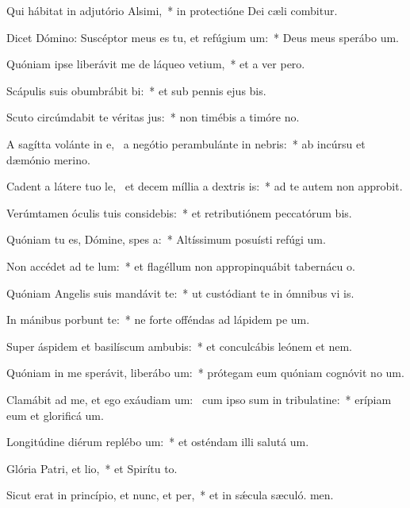 \item Qui hábitat in adjutório Alsimi,~* in protectióne Dei cæli combitur.
\item Dicet Dómino: Suscéptor meus es tu, et refúgium um:~* Deus meus sperábo  um.
\item Quóniam ipse liberávit me de láqueo vetium,~* et a ver pero.
\item Scápulis suis obumbrábit bi:~* et sub pennis ejus bis.
\item Scuto circúmdabit te véritas jus:~* non timébis a timóre no.
\item A sagítta volánte in e,~\pscross{} a negótio perambulánte in nebris:~* ab incúrsu et dæmónio merino.
\item Cadent a látere tuo le,~\pscross{} et decem míllia a dextris is:~* ad te autem non approbit.
\item Verúmtamen óculis tuis considebis:~* et retributiónem peccatórum bis.
\item Quóniam tu es, Dómine, spes a:~* Altíssimum posuísti refúgi um.
\item Non accédet ad te lum:~* et flagéllum non appropinquábit tabernácu o.
\item Quóniam Angelis suis mandávit  te:~* ut custódiant te in ómnibus vi is.
\item In mánibus porbunt te:~* ne forte offéndas ad lápidem pe um.
\item Super áspidem et basilíscum ambubis:~* et conculcábis leónem et nem.
\item Quóniam in me sperávit, liberábo um:~* prótegam eum quóniam cognóvit no um.
\item Clamábit ad me, et ego exáudiam um:~\pscross{} cum ipso sum in tribulatine:~* erípiam eum et glorificá um.
\item Longitúdine diérum replébo um:~* et osténdam illi salutá um.
\item Glória Patri, et lio,~* et Spirítu to.
\item Sicut erat in princípio, et nunc, et per,~* et in sǽcula sæculó. men.
